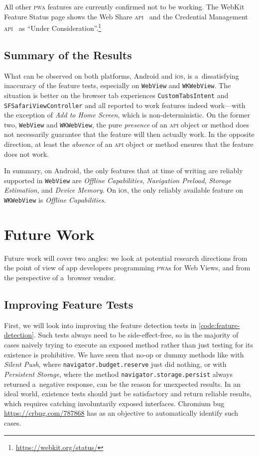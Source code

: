 \documentclass[sigconf,hyphens]{acmart}
\begin{document}
All other \textsc{pwa} features are currently confirmed not to be working.
The WebKit Feature Status page shows the Web Share \textsc{api}~\cite{giuca2017webshare}
and the Credential Management \textsc{api}~\cite{west2017credentialmanagement}
as ``Under Consideration''.\footnote{\url{https://webkit.org/status/}}

\subsection{Summary of the Results}

What can be observed on both platforms, Android and i\textsc{os},
is a~dissatisfying inaccuracy of the feature tests,
especially on \texttt{WebView} and \texttt{WKWebView}.
The situation is better on the browser tab experiences
\texttt{CustomTabsIntent} and \texttt{SFSafariViewController}
and all reported to work features indeed work---with
the exception of \emph{Add to Home Screen}, which is non-deterministic.
On the former two, \texttt{WebView} and \texttt{WKWebView},
the pure \emph{presence} of an \textsc{api} object or method
does not necessarily guarantee that the feature will then actually work.
In the opposite direction, at least the \emph{absence}
of an \textsc{api} object or method ensures that the feature does not work.

In summary, on Android, the only features that at time of writing
are reliably supported in \texttt{WebView}
are \emph{Offline Capabilities}, \emph{Navigation Preload}, \emph{Storage Estimation},
and \emph{Device Memory}.
On i\textsc{os}, the only reliably available feature on \texttt{WKWebView}
is \emph{Offline Capabilities}.

\section{Future Work}
\label{sec:future-work}

Future work will cover two angles:
we look at potential research directions from the point of view of app developers
programming \textsc{pwa}s for Web Views,
and from the perspective of a~browser vendor.

\subsection{Improving Feature Tests}

First, we will look into improving the feature detection tests in
\autoref{code:feature-detection}.
Such tests always need to be side-effect-free,
so in the majority of cases naively trying to execute an exposed method
rather than just testing for its existence is prohibitive.
We have seen that no-op or dummy methods like with \emph{Silent Push},
where \texttt{navigator.budget.reserve} just did nothing,
or with \emph{Persistent Storage}, 
where the method \texttt{navigator.storage.persist} always returned a~negative response,
can be the reason for unexpected results.
In an ideal world, existence tests should just be satisfactory and return reliable results,
which requires catching involuntarily exposed interfaces.
Chromium bug \url{https://crbug.com/787868} has as an objective
to automatically identify such cases.
\end{document}
